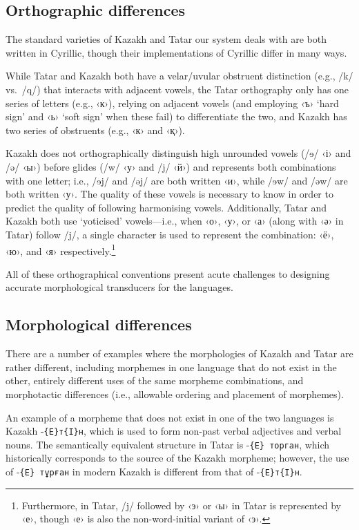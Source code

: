 \documentclass[a4paper,11pt]{article}
\begin{document}
\subsection{Orthographic differences}
The standard varieties of Kazakh and Tatar our system deals with are both written in Cyrillic, though their 
implementations of Cyrillic differ in many ways.

While Tatar and Kazakh both have a velar/uvular obstruent distinction (e.g., /k/ vs.\ /q/) that interacts with 
adjacent vowels, the Tatar orthography only has one series of letters (e.g., ‹к›), relying on adjacent 
vowels (and employing ‹ъ› `hard sign' and ‹ь› `soft sign' when these fail) to differentiate the two, and Kazakh 
has two series of obstruents (e.g., ‹к› and ‹қ›).

Kazakh does not orthographically distinguish high unrounded vowels (/{\qipa ɘ}/ ‹і› and /ə/ ‹ы›) before 
glides (/w/ ‹у› and /j/ ‹й›) and represents both combinations with one letter; i.e., /{\qipa ɘ}j/ and /əj/ are both 
written ‹и›, while /{\qipa ɘ}w/ and /əw/ are both written ‹у›.  The quality of these vowels is necessary to know in 
order to predict the quality of following harmonising vowels. %
Additionally, Tatar and Kazakh both use `yoticised' vowels---i.e., when ‹о›, ‹у›, or ‹а› (along with ‹ә› in 
Tatar) follow /j/, a single character is used to represent the combination: ‹ё›, ‹ю›, and ‹я› respectively.\footnote{Furthermore, in Tatar, /j/ followed by ‹э› or ‹ы› in Tatar is represented by ‹е›, though ‹е› is also the non-word-initial variant of ‹э›.}  %

All of these orthographical conventions present acute challenges to designing accurate morphological transducers for the languages.

\subsection{Morphological differences}
There are a number of examples where the morphologies of Kazakh and Tatar are rather different, including 
morphemes in one language that do not exist in the other, entirely different uses of the same morpheme 
combinations, and morphotactic differences (i.e., allowable ordering and placement of morphemes).

An example of a morpheme that does not exist in one of the two languages is Kazakh -\texttt{\{E\}т\{I\}н}, 
which is used to form non-past verbal adjectives and verbal nouns.  The semantically equivalent structure 
in Tatar is -\texttt{\{E\} торган}, which historically corresponds to the source of the Kazakh morpheme; 
however, the use of -\texttt{\{E\} тұрған} in modern Kazakh is different from that of -\texttt{\{E\}т\{I\}н}.
\end{document}
